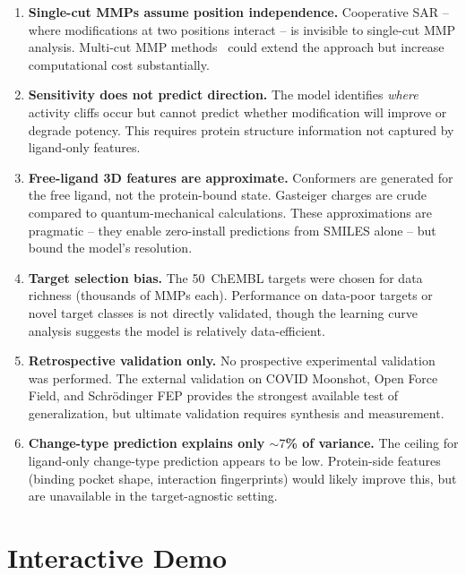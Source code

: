 \documentclass[sigconf, nonacm]{acmart}
\begin{document}
\begin{enumerate}
  \item \textbf{Single-cut MMPs assume position independence.} Cooperative SAR -- where modifications at two positions interact -- is invisible to single-cut MMP analysis. Multi-cut MMP methods~\cite{Leach2006} could extend the approach but increase computational cost substantially.

  \item \textbf{Sensitivity does not predict direction.} The model identifies \textit{where} activity cliffs occur but cannot predict whether modification will improve or degrade potency. This requires protein structure information not captured by ligand-only features.

  \item \textbf{Free-ligand 3D features are approximate.} Conformers are generated for the free ligand, not the protein-bound state. Gasteiger charges are crude compared to quantum-mechanical calculations. These approximations are pragmatic -- they enable zero-install predictions from SMILES alone -- but bound the model's resolution.

  \item \textbf{Target selection bias.} The 50~ChEMBL targets were chosen for data richness (thousands of MMPs each). Performance on data-poor targets or novel target classes is not directly validated, though the learning curve analysis suggests the model is relatively data-efficient.

  \item \textbf{Retrospective validation only.} No prospective experimental validation was performed. The external validation on COVID Moonshot, Open Force Field, and Schr\"{o}dinger FEP provides the strongest available test of generalization, but ultimate validation requires synthesis and measurement.

  \item \textbf{Change-type prediction explains only ${\sim}7$\% of variance.} The ceiling for ligand-only change-type prediction appears to be low. Protein-side features (binding pocket shape, interaction fingerprints) would likely improve this, but are unavailable in the target-agnostic setting.
\end{enumerate}

\section{Interactive Demo}
\end{document}
